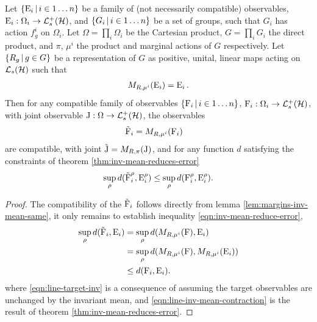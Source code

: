 \begin{thm}
  \label{thm:cov-obs-improve-approx}
  Let $\left\{\operatorname{E}_i\,\middle|\, i\in 1\hdots n\right\}$ be a family of (not necessarily compatible) observables, $\ope_i:\Omega_i \to \posops[\hcal]$, and $\left\{G_i\,\middle|\,i\in 1\hdots n\right\}$ be a set of groups, such that $G_i$ has action $f_g^i$ on $\Omega_i$. Let $\Omega = \prod_i \Omega_i$ be the Cartesian product, $G = \prod_i G_i$ the direct product, and $\pi$, $\mu^i$ the product and marginal actions of $G$ respectively. Let $\left\{R_g\,\middle|\,g\in G\right\}$ be a representation of $G$ as positive, unital, linear maps acting on $\saops[\hcal]$ such that
  \begin{align}
    M_{R,\mu^i}(\operatorname{E}_i) = \operatorname{E}_i.
  \end{align}
  Then for any compatible family of observables $\left\{\operatorname{F}_i\,\middle|\, i\in 1\hdots n\right\}$, $\opf_i:\Omega_i \to \posops[\hcal]$, with joint observable $\opj:\Omega\to\posops[\hcal]$, the observables
  \begin{align}
    \tilde{\operatorname{F}}_i &= M_{R, \mu^i}(\operatorname{F}_i)
  \end{align}
  are compatible, with joint $\tilde{\operatorname{J}} = M_{R, \pi}(\operatorname{J})$, and for any function $d$ satisfying the constraints of theorem \ref{thm:inv-mean-reduces-error}
  \begin{align}
    \label{eqn:inv-mean-reduce-error}
    \sup_\rho d(\tilde{\operatorname{F}}^\rho_i, \operatorname{E}_i^\rho) \leq \sup_\rho d(\operatorname{F}_i^\rho, \operatorname{E}_i^\rho).
  \end{align}
  \begin{proof}
    The compatibility of the $\tilde{\operatorname{F}}_i$ follows directly from lemma \ref{lem:margins-inv-mean-same}, it only remains to establish inequality \eqref{eqn:inv-mean-reduce-error},
    \begin{align}
      \sup_\rho  d(\tilde{\operatorname{F}}_i, \operatorname{E}_i) &= \sup_\rho d(M_{R, \mu^i}(\operatorname{F}), \operatorname{E}_i)\\
      \label{eqn:line-target-inv}
                                           &= \sup_\rho d(M_{R, \mu^i}(\operatorname{F}),  M_{R, \mu^i}(\operatorname{E}_i))\\
      \label{eqn:line-inv-mean-contraction}
                                           &\leq d(\operatorname{F}_i, \operatorname{E}_i).
    \end{align}
    where \eqref{eqn:line-target-inv} is a consequence of assuming the target observables are unchanged by the invariant mean, and \eqref{eqn:line-inv-mean-contraction} is the result of theorem \ref{thm:inv-mean-reduces-error}.
  \end{proof}
\end{thm}

